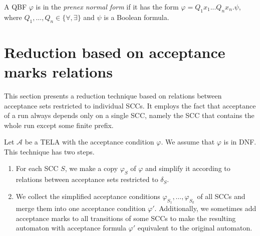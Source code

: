 \documentclass[a4paper,UKenglish,cleveref, autoref, thm-restate]{lipics-v2021}
\newcommand{\mA}{\mathcal{A}}
\begin{document}
A QBF $\varphi$ is in the \emph{prenex normal form} if it has the form
$\varphi = Q_{1}x_{1}...Q_{n}x_{n} . \psi$, where
$Q_1,\ldots,Q_n \in \{\forall, \exists\}$ and $\psi$ is a Boolean
formula.


\section{Reduction based on acceptance marks relations}\label{sec:standard}

This section presents a reduction technique based on relations between
acceptance sets restricted to individual SCCs. It employs the fact
that acceptance of a run always depends only on a single SCC, namely
the SCC that contains the whole run except some finite prefix.

Let $\mA$ be a TELA with the acceptance condition $\varphi$. We assume
that $\varphi$ is in DNF. This technique has two steps.
\begin{enumerate}
\item For each SCC $S$, we make a copy $\varphi_S$ of $\varphi$ and
  simplify it according to relations between acceptance sets
  restricted to $\delta_S$. 
\item We collect the simplified acceptance conditions
  $\varphi_{S_1},\ldots,\varphi_{S_k}$ of all SCCs and merge them into
  one acceptance condition $\varphi'$. Additionally, we sometimes add
  acceptance marks to all transitions of some SCCs to make the
  resulting automaton with acceptance formula $\varphi'$ equivalent to
  the original automaton.
\end{enumerate}

\end{document}
